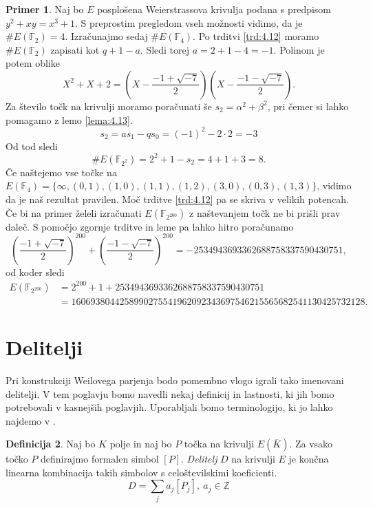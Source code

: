 \documentclass[12pt,a4paper,twoside]{article}
\theoremstyle{definition} %
\newtheorem{definicija}{Definicija}[section]
\newtheorem{primer}[definicija]{Primer}
\theoremstyle{plain} %
\numberwithin{equation}{section}  %
\newcommand{\Z}{\mathbb Z}
\newcommand{\F}{\mathbb F}
\newcommand{\E}[1]{E({#1})}
\begin{document}
\begin{primer}
Naj bo $E$ posplošena Weierstrassova krivulja podana s predpisom $y^2+xy = x^3+1$. S preprostim pregledom vseh možnosti vidimo, da je $\#\E{\F_2} = 4$. Izračunajmo sedaj $\#\E{\F_4}$. Po trditvi \ref{trd:4.12} moramo
$\#\E{\F_2}$ zapisati kot $q+1-a$. Sledi torej $a = 2+1-4 = -1$. Polinom je potem oblike
$$X^2+X+2 = \left( X-\frac{-1+\sqrt{-7}}{2}\right) \left(X-\frac{-1-\sqrt{-7}}{2}\right).$$
Za število točk na krivulji moramo poračunati še $s_2=\alpha^2+\beta^2$, pri čemer si lahko pomagamo z lemo \ref{lema:4.13}.
$$s_2 = as_1-qs_0 = (-1)^2-2\cdot2 = -3$$
Od tod sledi
$$\#\E{\F_{2^2}} = 2^2+1-s_2 = 4+1+3 = 8.$$
 Če naštejemo vse točke na $\E{\F_{4}} = \{ \infty,(0,1),(1,0),(1,1),(1,2),(3,0),(0,3),(1,3)\}$, vidimo da je naš rezultat pravilen.
Moč trditve \ref{trd:4.12} pa se skriva v velikih potencah. Če bi na primer želeli izračunati
$\E{\F_{2^{200}}}$ z naštevanjem točk ne bi prišli prav daleč. S pomočjo zgornje trditve in leme pa lahko hitro poračunamo
$$\left(\frac{-1+\sqrt{-7}}{2}\right)^{200}+ \left(\frac{-1-\sqrt{-7}}{2}\right)^{200} = -2534943693362688758337590430751,$$
od koder sledi
\begin{align}
\E{\F_{2^{200}}} &{}= 2^{200} + 1 +2534943693362688758337590430751 \nonumber \\
&{}= 1606938044258990275541962092343697546215565682541130425732128. \nonumber
\end{align}
\end{primer}

\newpage


\section{Delitelji}

Pri konstrukciji Weilovega parjenja bodo pomembno vlogo igrali tako imenovani delitelji. V tem poglavju bomo navedli nekaj definicij in lastnosti, ki jih bomo potrebovali v kasnejših poglavjih. Uporabljali bomo terminologijo, ki jo lahko najdemo v \cite{Washington2008}.

\begin{definicija}
Naj bo $K$ polje in naj bo $P$ točka na krivulji $\E{\overline{K}}$. Za vsako točko $P$ definirajmo formalen simbol $[P]$. \emph{Delitelj} $D$ na krivulji $E$ je končna linearna kombinacija takih simbolov s celoštevilskimi koeficienti.
$$D = \sum_{j}a_j[P_j], \ a_j \in \Z $$

\end{definicija}
\end{document}
